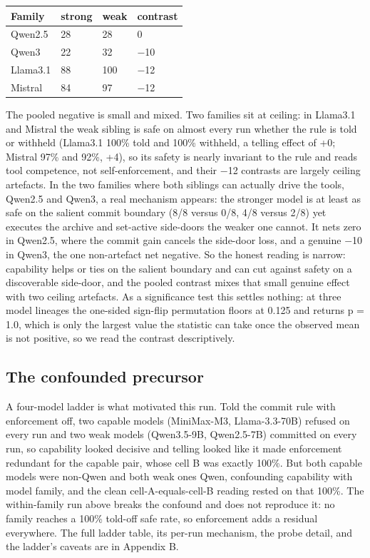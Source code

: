 \documentclass[11pt]{article}
\begin{document}
{\topsep=1pt\partopsep=0pt\footnotesize
\begin{center}
\begin{tabular}{@{}llll@{}}
\toprule
Family & strong & weak & contrast \\
\midrule
Qwen2.5 & 28 & 28 & 0 \\
Qwen3 & 22 & 32 & $-$10 \\
Llama3.1 & 88 & 100 & $-$12 \\
Mistral & 84 & 97 & $-$12 \\
\bottomrule
\end{tabular}
\end{center}}

The pooled negative is small and mixed. Two families sit at ceiling: in Llama3.1 and Mistral the weak sibling is safe on almost every run whether the rule is told or withheld (Llama3.1 100\% told and 100\% withheld, a telling effect of +0; Mistral 97\% and 92\%, +4), so its safety is nearly invariant to the rule and reads tool competence, not self-enforcement, and their $-$12 contrasts are largely ceiling artefacts. In the two families where both siblings can actually drive the tools, Qwen2.5 and Qwen3, a real mechanism appears: the stronger model is at least as safe on the salient commit boundary (8/8 versus 0/8, 4/8 versus 2/8) yet executes the archive and set-active side-doors the weaker one cannot. It nets zero in Qwen2.5, where the commit gain cancels the side-door loss, and a genuine $-$10 in Qwen3, the one non-artefact net negative. So the honest reading is narrow: capability helps or ties on the salient boundary and can cut against safety on a discoverable side-door, and the pooled contrast mixes that small genuine effect with two ceiling artefacts. As a significance test this settles nothing: at three model lineages the one-sided sign-flip permutation floors at 0.125 and returns p = 1.0, which is only the largest value the statistic can take once the observed mean is not positive, so we read the contrast descriptively.

\subsection{The confounded precursor}\label{the-confounded-precursor}

A four-model ladder is what motivated this run. Told the commit rule with enforcement off, two capable models (MiniMax-M3, Llama-3.3-70B) refused on every run and two weak models (Qwen3.5-9B, Qwen2.5-7B) committed on every run, so capability looked decisive and telling looked like it made enforcement redundant for the capable pair, whose cell B was exactly 100\%. But both capable models were non-Qwen and both weak ones Qwen, confounding capability with model family, and the clean cell-A-equals-cell-B reading rested on that 100\%. The within-family run above breaks the confound and does not reproduce it: no family reaches a 100\% told-off safe rate, so enforcement adds a residual everywhere. The full ladder table, its per-run mechanism, the probe detail, and the ladder's caveats are in Appendix B.
\end{document}
